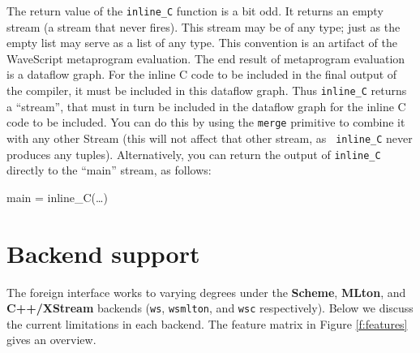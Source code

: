 The return value of the {\tt inline\_C} function is a bit odd.  It
returns an empty stream (a stream that never fires).  This stream may
be of any type; just as the empty list may serve as a list of any
type.  This convention is an artifact of the WaveScript metaprogram
evaluation.  The end result of metaprogram evaluation is a dataflow
graph.  For the inline C code to be included in the final output of
the compiler, it must be included in this dataflow graph.  Thus {\tt inline\_C}
returns a ``stream'', that must in turn be included in the dataflow
graph for the inline C code to be included.
%
You can do this by using the {\tt merge} primitive to combine it with any
other Stream (this will not affect that other stream, as {\tt
inline\_C} never produces any tuples).  Alternatively, you can return the
output of {\tt inline\_C} directly to the ``main'' stream,
as follows:

\begin{wscode}
main = inline\_C(\dots)
\end{wscode}



\section{Backend support}

The foreign interface works to varying degrees under the {\bf Scheme},
 {\bf MLton}, and {\bf C++/XStream} backends ({\tt ws}, {\tt wsmlton},
 and {\tt wsc} respectively).  Below we discuss the current  limitations in each
 backend.  The feature matrix in Figure \ref{f:features} gives an
 overview.

